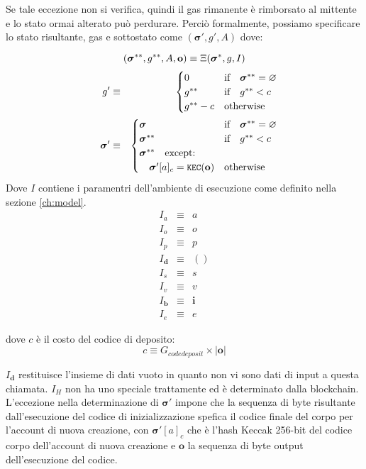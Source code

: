 \documentclass[9pt,oneside]{amsart}
\begin{document}
\begin{multicols}{2}
Se tale eccezione non si verifica, quindi il gas rimanente è rimborsato al mittente e lo stato ormai alterato può perdurare. Perciò formalmente, possiamo specificare lo stato risultante, gas e sottostato come $(\boldsymbol{\sigma}', g', A)$ dove:

\begin{equation}
(\boldsymbol{\sigma}^{**}, g^{**}, A, \mathbf{o}) \equiv \Xi(\boldsymbol{\sigma}^*, g, I) \\
\end{equation}
\begin{eqnarray}
\quad g' & \equiv & \begin{cases}
0 & \text{if} \quad \boldsymbol{\sigma}^{**} = \varnothing \\
g^{**} & \text{if} \quad g^{**} < c \\
g^{**} - c & \text{otherwise} \\
\end{cases} \\
\quad \boldsymbol{\sigma}' & \equiv & \begin{cases}
\boldsymbol{\sigma} & \text{if} \quad \boldsymbol{\sigma}^{**} = \varnothing \\
\boldsymbol{\sigma}^{**} & \text{if} \quad g^{**} < c \\
\boldsymbol{\sigma}^{**} \quad \text{except:} & \\
\quad\boldsymbol{\sigma}'[a]_c = \texttt{\small KEC}(\mathbf{o}) & \text{otherwise}
\end{cases}
\end{eqnarray}
Dove $I$ contiene i paramentri dell'ambiente di esecuzione come definito nella sezione \ref{ch:model}.
\begin{eqnarray}
I_a & \equiv & a \\
I_o & \equiv & o \\
I_p & \equiv & p \\
I_\mathbf{d} & \equiv & () \\
I_s & \equiv & s \\
I_v & \equiv & v \\
I_\mathbf{b} & \equiv & \mathbf{i} \\
I_e & \equiv & e
\end{eqnarray}

dove $c$ è il costo del codice di deposito:
\begin{equation}
c \equiv G_{codedeposit} \times |\mathbf{o}|
\end{equation}

$I_\mathbf{d}$ restituisce l'insieme di dati vuoto in quanto non vi sono dati di input a questa chiamata. $I_H$ non ha uno speciale trattamente ed è determinato dalla blockchain. L'eccezione nella determinazione di $\boldsymbol{\sigma}'$ impone che la sequenza di byte risultante dall'esecuzione del codice di inizializzazione spefica il codice finale del corpo per l'account di nuova creazione, con $\boldsymbol{\sigma}'[a]_c$ che è l'hash Keccak 256-bit del codice corpo dell'account di nuova creazione e $\mathbf{o}$ la sequenza di byte output dell'esecuzione del codice.


\end{multicols}
\end{document}
